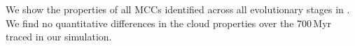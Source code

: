 \IfFileExists{emulateapjlegacy.cls}{\documentclass[iop]{emulateapjlegacy}}{\documentclass[iop]{emulateapj}}
\def\figpath{./Fig}
\begin{document}
We show the properties of all MCCs identified across all evolutionary stages in . We find no quantitative differences in the cloud properties over the 700\,Myr traced in our simulation.

%
%
%
\end{document}
